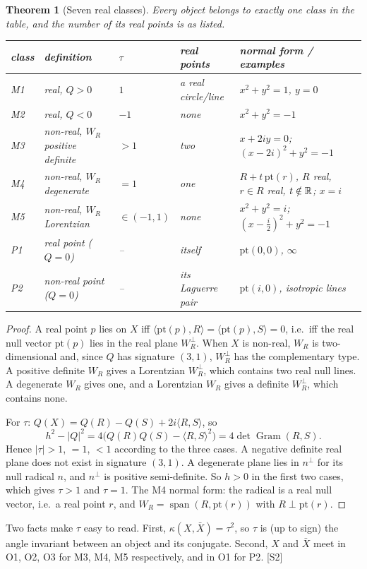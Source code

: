 \documentclass[11pt]{article}
\newtheorem{theorem}{Theorem}[section]\newtheorem{proposition}[theorem]{Proposition}
\theoremstyle{definition}\newtheorem{definition}[theorem]{Definition}\newtheorem{remark}[theorem]{Remark}\newtheorem{example}[theorem]{Example}
\newcommand{\ip}[2]{\langle #1,#2\rangle}\newcommand{\pt}{\mathrm{pt}}\newcommand{\Qd}{\mathcal{Q}}
\newcommand{\chk}[1]{\hfill{\footnotesize\textsf{[#1]}}}
\newcommand{\cls}[1]{\textsf{#1}}
\begin{document}
\begin{theorem}[Seven real classes]\label{thm:seven}
Every object belongs to exactly one class in the table, and the number of its real points is as listed.
\begin{center}\footnotesize\begin{tabular}{@{}lp{3.3cm}lp{2.2cm}p{5.6cm}@{}}\toprule
class & definition & $\tau$ & real points & normal form / examples\\\midrule
\cls{M1} & real, $Q>0$ & $1$ & a real circle/line & $x^2+y^2=1$, $y=0$\\
\cls{M2} & real, $Q<0$ & $-1$ & none & $x^2+y^2=-1$\\
\cls{M3} & non-real, $W_R$ positive definite & $>1$ & two & $x+2iy=0$; $(x-2i)^2+y^2=-1$\\
\cls{M4} & non-real, $W_R$ degenerate & $=1$ & one & $R+t\,\pt(r)$, $R$ real, $r\in R$ real, $t\notin\mathbb{R}$; $x=i$\\
\cls{M5} & non-real, $W_R$ Lorentzian & $\in(-1,1)$ & none & $x^2+y^2=i$; $(x-\tfrac i2)^2+y^2=-1$\\
\cls{P1} & real point ($Q=0$) & -- & itself & $\pt(0,0)$, $\infty$\\
\cls{P2} & non-real point ($Q=0$) & -- & its Laguerre pair & $\pt(i,0)$, isotropic lines\\\bottomrule\end{tabular}\end{center}
\end{theorem}
\begin{proof}
A real point $p$ lies on $X$ iff $\ip{\pt(p)}R=\ip{\pt(p)}S=0$, i.e.\ iff the real null vector $\pt(p)$ lies in the real plane $W_R^\perp$. When $X$ is non-real, $W_R$ is two-dimensional and, since $Q$ has signature $(3,1)$, $W_R^\perp$ has the complementary type. A positive definite $W_R$ gives a Lorentzian $W_R^\perp$, which contains two real null lines. A degenerate $W_R$ gives one, and a Lorentzian $W_R$ gives a definite $W_R^\perp$, which contains none.

For $\tau$: $Q(X)=Q(R)-Q(S)+2i\ip RS$, so
\[h^2-|Q|^2=4\bigl(Q(R)Q(S)-\ip RS^2\bigr)=4\det\operatorname{Gram}(R,S).\]
Hence $|\tau|>1$, $=1$, $<1$ according to the three cases. A negative definite real plane does not exist in signature $(3,1)$. A degenerate plane lies in $n^\perp$ for its null radical $n$, and $n^\perp$ is positive semi-definite. So $h>0$ in the first two cases, which gives $\tau>1$ and $\tau=1$. The \cls{M4} normal form: the radical is a real null vector, i.e.\ a real point $r$, and $W_R=\operatorname{span}(R,\pt(r))$ with $R\perp\pt(r)$.
\end{proof}
\noindent Two facts make $\tau$ easy to read. First, $\kappa(X,\bar X)=\tau^2$, so $\tau$ is (up to sign) the angle invariant between an object and its conjugate. Second, $X$ and $\bar X$ meet in O1, O2, O3 for \cls{M3}, \cls{M4}, \cls{M5} respectively, and in O1 for \cls{P2}. \chk{S2}
\end{document}
